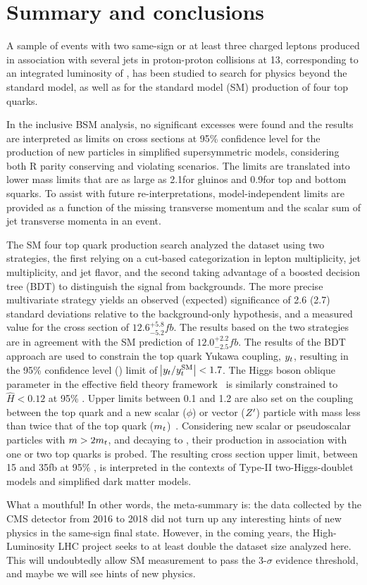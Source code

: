 \chapter{Summary and conclusions}

A sample of events with two same-sign or at least three charged leptons
produced in association with several jets in proton-proton collisions at
13\TeV, corresponding to an integrated luminosity of \sslumi, has been
studied to search for physics beyond the standard model, as well as for the
standard model (SM) production of four top quarks.

In the inclusive BSM analysis, no significant excesses were found and the
results are interpreted as limits on cross sections at 95\% confidence level
for the production of new particles in simplified supersymmetric models,
considering both R parity conserving and violating scenarios. The limits
are translated into lower mass limits that are as large as 2.1\TeV for
gluinos and 0.9\TeV for top and bottom squarks. 
To assist with future re-interpretations, model-independent limits are
provided as a function of the missing transverse momentum and the scalar sum
of jet transverse momenta in an event.

The SM four top quark production search analyzed the dataset using two
strategies, the first relying on a cut-based categorization in lepton
multiplicity, jet multiplicity, and jet flavor, and the second taking
advantage of a boosted decision tree (BDT) to distinguish the \tttt signal
from backgrounds. The more precise multivariate strategy yields an observed
(expected) significance of 2.6 (2.7) standard deviations relative to the
background-only hypothesis, and a measured value for the \tttt cross section
of $12.6^{+5.8}_{-5.2}\unit{fb}$. The results based on the two strategies are
in agreement with the SM prediction of $12.0^{+2.2}_{-2.5}\unit{fb}$. The
results of the BDT approach are used to constrain the top quark Yukawa
coupling, $y_{t}$, resulting in the 95\% confidence level (\CL) limit of
$\abs{y_{t}/y_{t}^{\mathrm{SM}}} < 1.7$. The Higgs boson oblique
parameter in the effective field theory
framework~\cite{THEORY:ObliqueHiggs2019} is similarly constrained to $\hat{H}
< 0.12$ at 95\% \CL. Upper limits between 0.1 and 1.2 are also set on the
coupling between the top quark and a new scalar ($\phi$) or vector ($Z^\prime$)
particle with mass less than twice that of the top quark
($m_t$)~\cite{THEORY:Alvarez2016nrz}. Considering new scalar or
pseudoscalar particles with $m > 2m_t$, and decaying to \ttbar,
their production in association with one or two top quarks is probed.
The resulting cross section upper limit, between 15 and
35\unit{fb} at 95\% \CL, is interpreted in the contexts of Type-II
two-Higgs-doublet models and simplified dark matter models.

What a mouthful! In other words, the meta-summary is: the data collected by
the CMS detector from 2016 to 2018 did not turn up any interesting hints of
new physics in the same-sign final state. However, in the coming years, the
High-Luminosity LHC project seeks to at least double the dataset size
analyzed here. This will undoubtedly allow SM \tttt measurement to pass the
3-$\sigma$ evidence threshold, and maybe we will see hints of new physics.

